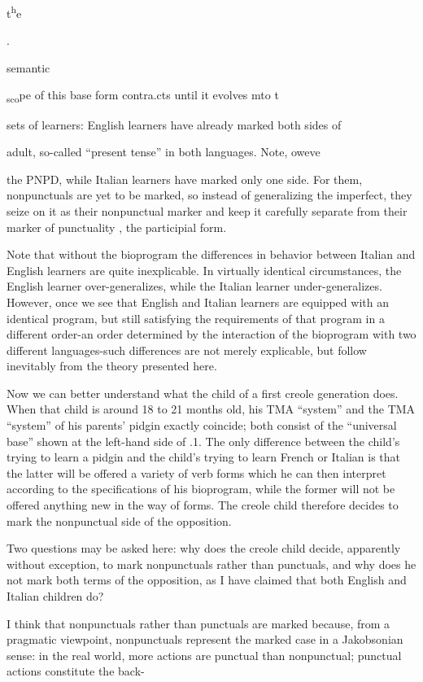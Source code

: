 t\textsuperscript{h}e

.

semantic

\textsubscript{sc}\textsubscript{o}pe of this base form contra.cts until it evolves mto t

sets of learners: English learners have already marked both sides of

adult, so-called ``present tense'' in both languages. Note, oweve 


the PNPD, while Italian learners have marked only one side. For them, nonpunctuals are yet to be marked, so instead of generalizing the imperfect, they seize on it as their nonpunctual marker and keep it carefully separate from their marker of punctuality , the participial form.

Note that without the bioprogram the differences in behavior between Italian and English learners are quite inexplicable. In virtually identical circumstances, the English learner over-generalizes, while the Italian learner under-generalizes. However, once we see that English and Italian learners are equipped with an identical program, but still satisfying the requirements of that program in a different order-an order determined by the interaction of the bioprogram with two different languages-such differences are not merely explicable, but follow inevitably from the theory presented here.

Now we can better understand what the child of a first creole generation does. When that child is around 18 to 21 months old, his TMA ``system'' and the TMA ``system'' of his parents' pidgin exactly coincide; both consist of the ``universal base'' shown at the left-hand side of .1. The only difference between the child's trying to learn a pidgin and the child's trying to learn French or Italian is that the latter will be offered a variety of verb forms which he can then interpret according to the specifications of his bioprogram, while the former will not be offered anything new in the way of forms. The creole child therefore decides to mark the nonpunctual side of the opposition.

Two questions may be asked here: why does the creole child decide, apparently without exception, to mark nonpunctuals rather than punctuals, and why does he not mark both terms of the opposi\-tion, as I have claimed that both English and Italian children do?

I think that nonpunctuals rather than punctuals are marked because, from a pragmatic viewpoint, nonpunctuals represent the marked case in a Jakobsonian sense: in the real world, more actions are punctual than nonpunctual; punctual actions constitute the back-

